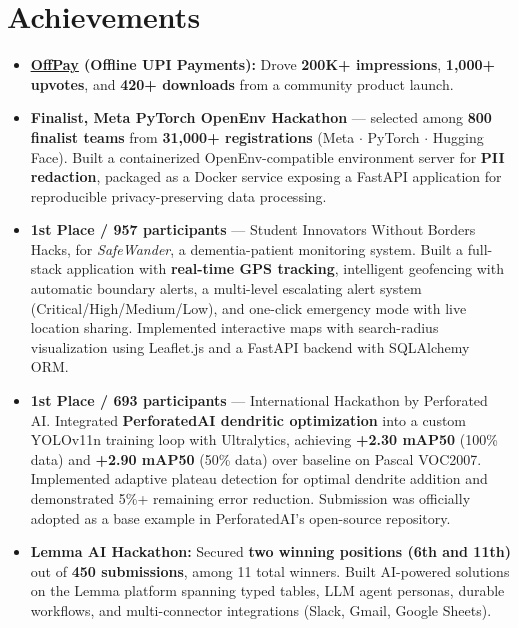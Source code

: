 \documentclass[letterpaper,10pt]{article}
\begin{document}
\section{Achievements}
  \begin{itemize}[leftmargin=0.28in, itemsep=1pt, topsep=2pt, parsep=0pt]
    \small
      \item \textbf{\href{https://offpay.vercel.app}{\underline{OffPay}} (Offline UPI Payments):} Drove \textbf{200K+ impressions}, \textbf{1,000+ upvotes}, and \textbf{420+ downloads} from a community product launch.

      \item \textbf{Finalist, Meta PyTorch OpenEnv Hackathon} --- selected among \textbf{800 finalist teams} from \textbf{31,000+ registrations} (Meta $\cdot$ PyTorch $\cdot$ Hugging Face). Built a containerized OpenEnv-compatible environment server for \textbf{PII redaction}, packaged as a Docker service exposing a FastAPI application for reproducible privacy-preserving data processing.

      \item \textbf{1st Place / 957 participants} --- Student Innovators Without Borders Hacks, for \emph{SafeWander}, a dementia-patient monitoring system. Built a full-stack application with \textbf{real-time GPS tracking}, intelligent geofencing with automatic boundary alerts, a multi-level escalating alert system (Critical/High/Medium/Low), and one-click emergency mode with live location sharing. Implemented interactive maps with search-radius visualization using Leaflet.js and a FastAPI backend with SQLAlchemy ORM.

      \item \textbf{1st Place / 693 participants} --- International Hackathon by Perforated AI. Integrated \textbf{PerforatedAI dendritic optimization} into a custom YOLOv11n training loop with Ultralytics, achieving \textbf{+2.30 mAP50} (100\% data) and \textbf{+2.90 mAP50} (50\% data) over baseline on Pascal VOC2007. Implemented adaptive plateau detection for optimal dendrite addition and demonstrated 5\%+ remaining error reduction. Submission was officially adopted as a base example in PerforatedAI's open-source repository.

      \item \textbf{Lemma AI Hackathon:} Secured \textbf{two winning positions (6th and 11th)} out of \textbf{450 submissions}, among 11 total winners. Built AI-powered solutions on the Lemma platform spanning typed tables, LLM agent personas, durable workflows, and multi-connector integrations (Slack, Gmail, Google Sheets).
  \end{itemize}\vspace{-5pt}
\end{document}
